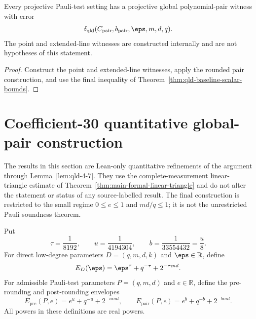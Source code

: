 \begin{theorem}
\label{thm:qld-global-pair-witness-explicit}
\leanok
Every projective Pauli-test setting has a projective global polynomial-pair
witness with error
\[
 \delta_{\mathrm{qld}}(C_{\mathrm{pair}},b_{\mathrm{pair}},
   \eps,m,d,q).
\]
The point and extended-line witnesses are constructed internally and are not
hypotheses of this statement.
\end{theorem}
\begin{proof}
\leanok
{}
Construct the point and extended-line witnesses, apply the rounded pair
construction, and use the final inequality of
Theorem~\ref{thm:qld-baseline-scalar-bounds}.
\end{proof}

\section{Coefficient-30 quantitative global-pair construction}
\label{sec:qld-coefficient-thirty-global-pair}

The results in this section are Lean-only quantitative refinements of the
argument through Lemma~\ref{lem:qld-4-7}. They use the complete-measurement
linear-triangle estimate of Theorem~\ref{thm:main-formal-linear-triangle} and
do not alter the statement or status of any source-labelled result. The final
construction is restricted to the small regime $0\leq e\leq1$ and
$md/q\leq1$; it is not the unrestricted Pauli soundness theorem.

\begin{definition}
\label{def:qld-coefficient-thirty-scales}
\leanok
Put
\[
 \tau=\frac1{8192},\qquad
 u=\frac1{4194304},\qquad
 b=\frac1{33554432}=\frac u8.
\]
For direct low-degree parameters $D=(q,m,d,k)$ and $\eps\in\mathbb R$, define
\[
 E_D(\eps)=\eps^\tau+q^{-\tau}+2^{-\tau md}.
\]
For admissible Pauli-test parameters $P=(q,m,d)$ and $e\in\mathbb R$, define
the pre-rounding and post-rounding envelopes
\[
 E_{\mathrm{pre}}(P,e)=e^u+q^{-u}+2^{-umd},
 \qquad
 E_{\mathrm{pair}}(P,e)=e^b+q^{-b}+2^{-bmd}.
\]
All powers in these definitions are real powers.
\end{definition}

